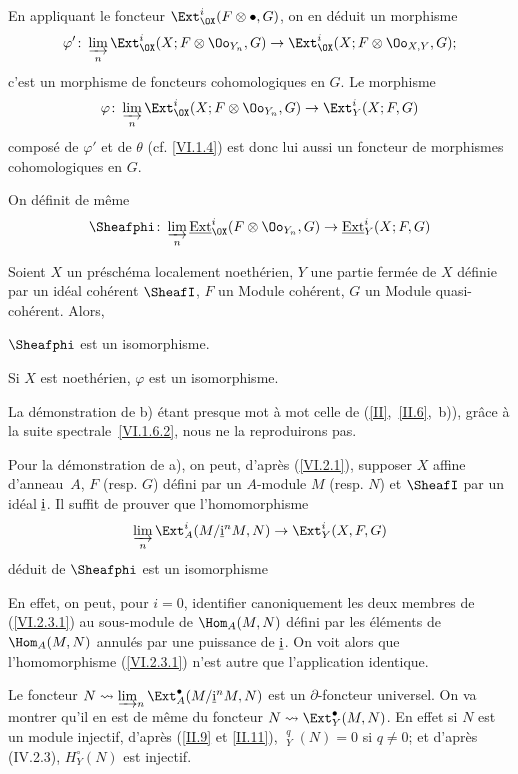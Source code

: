 En appliquant le foncteur $\Ext_{\OX}^i(F\otimes\bullet, G)$, on en d\'eduit un morphisme
$$
\varphi'\colon \varinjlim_{n} \Ext_{\OX}^i(X;F\otimes \Oo_{Y_n}, G) \to \Ext_{\OX}^i(X;F \otimes \Oo_{X, Y}, G);
$$
c'est un morphisme de foncteurs cohomologiques en $G$. Le morphisme
$$
\varphi\colon \varinjlim_{n} \Ext_{\OX}^i(X;F\otimes \Oo_{Y_n}, G) \to \Ext_Y^i(X;F, G)
$$
compos\'e de $\varphi'$ et de $\theta$ (cf. \ref{VI.1.4}) est donc lui aussi un foncteur de morphismes cohomologiques en $G$.

On d\'efinit de m\^eme
$$
\Sheafphi\colon \varinjlim_n \mathop{\underline{\mathrm{Ext}}}\nolimits_{\OX}^i(F \otimes \Oo_{Y_n}, G) \to \mathop{\underline{\mathrm{Ext}}}\nolimits_Y^i(X;F, G)
$$

\begin{theoreme} \label{VI.2.3}
Soient $X$ un pr\'esch\'ema localement noeth\'erien, $Y$ une partie ferm\'ee de $X$ d\'efinie par un id\'eal coh\'erent $\SheafI$, $F$ un Module coh\'erent, $G$ un Module quasi-coh\'erent. Alors,
\begin{enumeratea}
\item
$\Sheafphi$ est un isomorphisme.
\item
Si $X$ est noeth\'erien, $\varphi$ est un isomorphisme.
\end{enumeratea}
\end{theoreme}

La d\'emonstration de b) \'etant presque mot \`a mot celle de (\ref{II},~\ref{II.6},~b)), gr\^ace \`a la suite spectrale~\ref{VI.1.6.2}, nous ne la reproduirons pas.

Pour la d\'emonstration de a), on peut, d'apr\`es (\ref{VI.2.1}), supposer $X$ affine d'anneau~$A$, $F$ (resp. $G$) d\'efini par un $A$-module $M$ (resp. $N$) et $\SheafI$ par un id\'eal $\underline{\rm{i}}$. Il suffit de prouver que l'homomorphisme
\begin{equation} \label{VI.2.3.1} \varinjlim_{{n}} \Ext_A^i(M/\underline{\rm{i}}^nM, N) \to \Ext_Y^i(X, F, G)
\end{equation}
d\'eduit de $\Sheafphi$ est un isomorphisme

En effet, on peut, pour $i=0$, identifier canoniquement les deux membres de (\ref{VI.2.3.1}) au sous-module de $\Hom_A(M, N)$ d\'efini par les \'el\'ements de $\Hom_A(M, N)$ annul\'es par une puissance de $\underline{\rm{i}}$. On voit alors que l'homomorphisme (\ref{VI.2.3.1}) n'est autre que l'application identique.

Le foncteur $N\rightsquigarrow \varinjlim_{n} \Ext_A^\bullet(M/\underline{\rm{i}}^nM, N)$ est un $\partial$-foncteur universel. On va montrer qu'il en est de m\^eme du foncteur $N \rightsquigarrow \Ext_Y^\bullet(M, N)$. En effet si $N$ est un module injectif, d'apr\`es (\ref{II.9} et \ref{II.11}), $\mathop{\underline{\mathrm{H}}}\nolimits_Y^q(N)=0$ si $q \neq 0$; et d'apr\`es (IV.2.3), $H_Y^{\circ}(N)$ est injectif.

